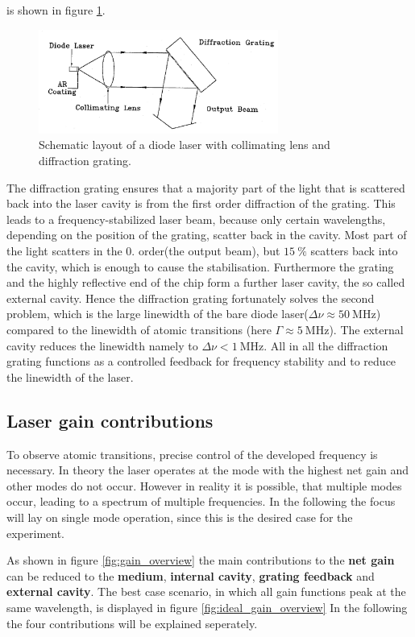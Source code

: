 is shown in figure \ref{fig:aufbau}.
\begin{figure}
  \centering
  \includegraphics[width=0.7\textwidth]{aufbau.png}
  \caption{Schematic layout of a diode laser with collimating lens and diffraction grating.\cite{V61}}
  \label{fig:aufbau}
\end{figure}

The diffraction grating ensures that a majority part of
the light that is scattered back into the laser cavity is from the first order
diffraction of the grating. This leads to
a frequency-stabilized laser beam, because only certain wavelengths,
depending on the position
of the grating, scatter back in the cavity.
Most part of the light scatters in the 0. order(the output beam), but $\SI{15}{\percent}$ scatters back into
the cavity, which is enough to cause the stabilisation.
Furthermore the grating and the highly reflective end of the chip form a
further laser cavity,
the so called external cavity.
Hence the diffraction grating fortunately solves the second
problem, which is the large linewidth of the bare
diode laser($\Delta \nu \approx \SI{50}{\mega\hertz}$)
compared to the linewidth of atomic transitions
(here $\Gamma \approx \SI{5}{\mega\hertz}$).
The external cavity
reduces the linewidth namely to $\Delta \nu < \SI{1}{\mega\hertz}$.
All in all the diffraction grating
functions as a controlled feedback for frequency stability
and to reduce the linewidth of the laser.


\subsection{Laser gain contributions}
\label{subsec:}
To observe atomic transitions, precise control
of the developed frequency is necessary.
In theory the laser operates at the mode with the highest net gain
and other modes do not occur.
However in reality it is possible, that multiple modes occur, leading
to a spectrum of multiple frequencies. In the following the focus will
lay on single mode operation, since this is the desired case
for the experiment.

As shown in figure \ref{fig:gain_overview} the main contributions
to the \textbf{net gain} can be reduced to
the \textbf{medium}, \textbf{internal cavity}, \textbf{grating feedback}
and  \textbf{external cavity}.
The best case scenario, in which all gain functions peak at the
same wavelength, is displayed in figure \ref{fig:ideal_gain_overview}
In the following the four contributions will be explained seperately.


